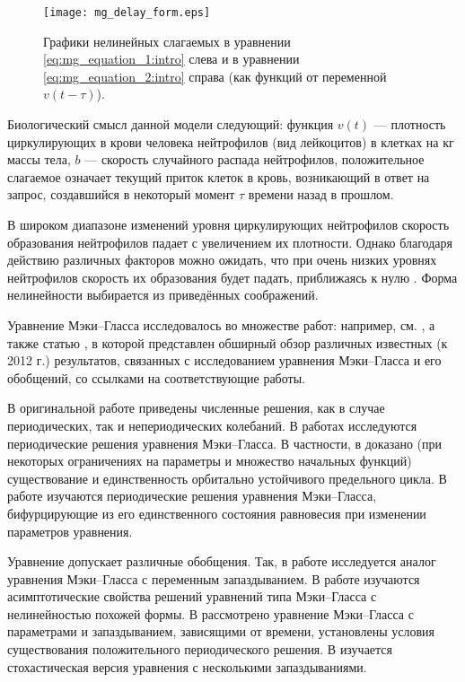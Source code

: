 \begin{figure}
	\centering
	\texttt{[image: mg\_delay\_form.eps]}
	\caption{Графики нелинейных слагаемых в уравнении \eqref{eq:mg_equation_1:intro} слева и в уравнении \eqref{eq:mg_equation_2:intro} справа (как функций от переменной $v(t - \tau)$).
	}
	\label{fig:mg_delay_form}
\end{figure}

Биологический смысл данной модели следующий: функция $v(t)$ --- плотность циркулирующих в крови человека нейтрофилов (вид лейкоцитов) в клетках на кг массы тела, $b$ --- скорость случайного распада нейтрофилов, положительное слагаемое означает текущий приток клеток в кровь, возникающий в ответ на запрос, создавшийся в некоторый момент $\tau$ времени назад в прошлом.

В широком диапазоне изменений уровня циркулирующих нейтрофилов скорость образования нейтрофилов падает с увеличением их плотности. Однако благодаря действию различных факторов можно ожидать, что при очень низких уровнях нейтрофилов скорость их образования будет падать, приближаясь к нулю \cite[с. 85]{Mackey1977}. Форма нелинейности выбирается из приведённых соображений.

Уравнение Мэки--Гласса исследовалось во множестве работ: например, см. \cite{Junges2012, Su2011, Wu2007, Kubyshkin2016, Krisztin2020, Bartha2021}, а также статью \cite{Berezansky2012}, в которой представлен обширный обзор различных известных (к 2012 г.) результатов, связанных с исследованием уравнения Мэки--Гласса и его обобщений, со ссылками на соответствующие работы. 

В оригинальной работе \cite{Mackey1977} приведены численные решения, как в случае периодических, так и непериодических колебаний. В работах \cite{Krisztin2020, Bartha2021} исследуются периодические решения уравнения Мэки--Гласса. В частности, в \cite{Bartha2021} доказано (при некоторых ограничениях на параметры и множество начальных функций) существование и единственность орбитально устойчивого предельного цикла. В работе \cite{Kubyshkin2016} изучаются периодические решения уравнения Мэки--Гласса, бифурцирующие из его единственного состояния равновесия при изменении параметров уравнения.

Уравнение допускает различные обобщения. Так, в работе \cite{Berezansky2006} исследуется аналог уравнения Мэки--Гласса с переменным запаздыванием. В работе \cite{Liz2002} изучаются асимптотические свойства решений уравнений типа Мэки--Гласса с нелинейностью похожей формы. В \cite{Wu2007} рассмотрено уравнение Мэки--Гласса с параметрами и запаздыванием, зависящими от времени, установлены условия существования положительного периодического решения. В \cite{Huang2024} изучается стохастическая версия уравнения с несколькими запаздываниями. 

